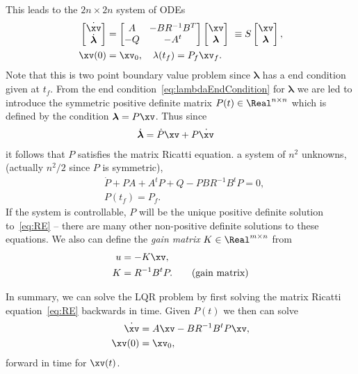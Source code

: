 \documentclass[11pt]{article}
\newcommand{\lambdav}{\boldsymbol{\lambda}}
\begin{document}
This leads to the $2n\times 2n$ system of ODEs 
\begin{align}
 \begin{bmatrix} \dot{\xv} \\ \dot{\lambdav} \end{bmatrix}
   &= \begin{bmatrix} A  & -B R^{-1} B^T \\
                      - Q & -A^t \end{bmatrix}
      \begin{bmatrix} \xv \\ \lambdav \end{bmatrix}  ~\equiv S \begin{bmatrix} \xv \\ \lambdav \end{bmatrix} , \label{eq:Smatrix} \\
  \xv(0)&=\xv_0, \quad \lambda(t_f) = P_f \xv_f . \label{eq:lambdaEndCondition}
\end{align}
Note that this is two point boundary value problem since $\lambdav$ has
a end condition given at $t_f$.
From the end condition~\eqref{eq:lambdaEndCondition} for $\lambdav$ we are led to introduce the symmetric
positive definite matrix $P(t)\in \Real^{n\times n}$ which is defined by the condition $\lambdav = P \xv$. Thus since
\begin{align}
   \dot{\lambdav} &= \dot{P}\xv + P \dot{\xv}
\end{align}
it follows that $P$ satisfies the matrix Ricatti equation. a system of $n^2$ unknowns, (actually $n^2/2$ since $P$ is symmetric), 
\begin{align}
  & \dot{P} + P A + A^t P + Q - P B R^{-1} B^t P = 0 ,  \\ \label{eq:RE}
  &  P(t_f) = P_f. 
\end{align}
If the system is controllable, $P$ will be the unique positive definite solution to~\eqref{eq:RE} -- there are
many other non-positive definite solutions to these equations. 
We also can define the {\em gain matrix} $K\in \Real^{m\times n}$ from 
\begin{align}
   u & = - K \xv, \\
  K &= R^{-1} B^t P . \qquad \text{(gain matrix)} 
\end{align}

In summary, we can solve the LQR problem by first solving the matrix Ricatti equation~\eqref{eq:RE} backwards in time.
Given $P(t)$ we then can solve
\begin{align}
    \dot{\xv} &= A \xv  - BR^{-1} B^t P\xv ,  \label{eq:stateEquationWithControlDefined} \\
  \xv(0) &= \xv_0, 
\end{align}
forward in time for $\xv(t)$. 
\end{document}
